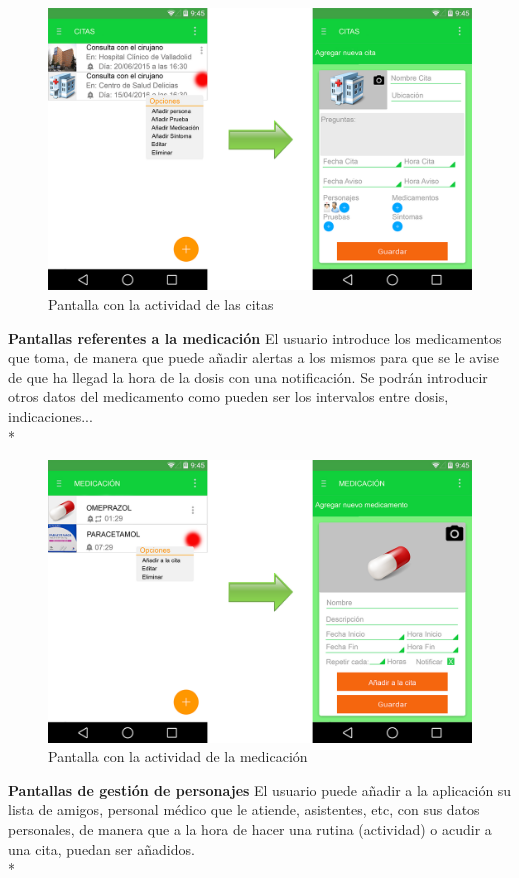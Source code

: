 \documentclass[../pfc.tex]{subfiles}
\begin{document}
			\begin{figure}[h]
				\centering
				\includegraphics[width=0.7\linewidth]{../images/citas}
				\caption{Pantalla con la actividad de las citas}
				\label{fig:citas}
			\end{figure}
			
			
			\textbf{Pantallas referentes a la medicación}
			El usuario introduce los medicamentos que toma, de manera que puede añadir alertas a los mismos para que se le avise de que ha llegad la hora de la dosis con una notificación.
			Se podrán introducir otros datos del medicamento como pueden ser los intervalos entre dosis, indicaciones...\\*
			
			\begin{figure}[h]
				\centering
				\includegraphics[width=0.7\linewidth]{../images/medicacion}
				\caption{Pantalla con la actividad de la medicación}
				\label{fig:medicacion}
			\end{figure}
			
			
			\textbf{Pantallas de gestión de personajes}
			El usuario puede añadir a la aplicación su lista de amigos, personal médico que le atiende, asistentes, etc, con sus datos personales, de manera que a la hora de hacer una rutina (actividad) o acudir a una cita, puedan ser añadidos.\\*
			
\end{document}
